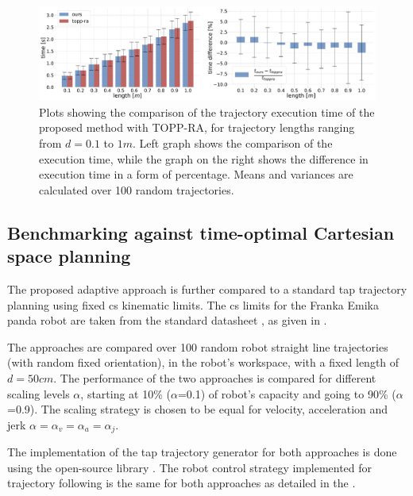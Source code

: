 \begin{figure}[!t]
    \centering
    \includegraphics[width=\linewidth]{Papers/imgs/toppra_ruckig_time_comp.pdf}
    \caption{Plots showing the comparison of the trajectory execution time of the proposed method with TOPP-RA, for trajectory lengths ranging from $d=0.1$ to $1m$. Left graph shows the comparison of the execution time, while the graph on the right shows the difference in execution time in a form of percentage. Means and variances are calculated over 100 random trajectories.}
    \label{fig:comparison_time}
\end{figure}


\subsection{Benchmarking against time-optimal Cartesian space planning}

The proposed adaptive approach is further compared to a standard \gls{tap} trajectory planning using fixed \gls{cs} kinematic limits. The \gls{cs} limits for the Franka Emika panda robot are taken from the standard datasheet \cite{frankadata}, as given in .

The approaches are compared over 100 random robot straight line trajectories (with random fixed orientation), in the robot's workspace, with a fixed length of $d=50cm$. The performance of the two approaches is compared for different scaling levels $\alpha$, starting at 10\% ($\alpha$=0.1) of robot's capacity and going to 90\% ($\alpha$=0.9). The scaling strategy is chosen to be equal for velocity, acceleration and jerk $\alpha\!=\!\alpha_v\!=\!\alpha_a\!=\!\alpha_j$. 

The implementation of the \gls{tap} trajectory generator for both approaches is done using the open-source library  \cite{ruckig}. The robot control strategy implemented for trajectory following is the same for both approaches as detailed in the .

